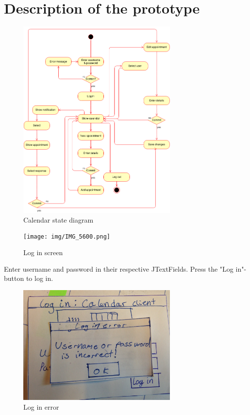 \documentclass{article}
\begin{document}




\section{Description of the prototype}
\begin{figure}[h!] 
    \begin{center} 
        \includegraphics[width=8cm]{img/calendarStateDiagram.png}
        \caption{Calendar state diagram}
    \label{calendarstatediagram}
    \end{center}
\end{figure}

\newpage

\begin{figure}[h!] 
    \begin{center} 
        \texttt{[image: img/IMG\_5600.png]}
        \caption{Log in screen}
    \label{login}
    \end{center}
\end{figure}

Enter username and password in their respective JTextFields. Press the "Log in"-button to log in.

\begin{figure}[h!] 
    \begin{center} 
        \includegraphics[width=8cm]{img/IMG_5612.JPG}
        \caption{Log in error}
    \label{loginerror}
    \end{center}
\end{figure}
\end{document}
